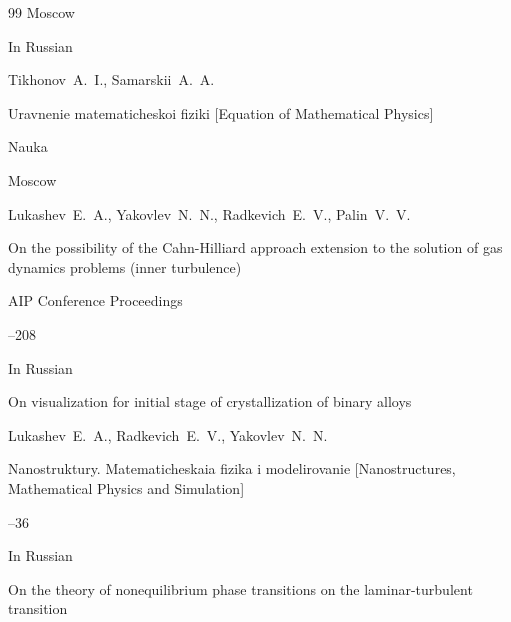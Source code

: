 \begin{thebibliography}{99}
\publaddr Moscow







\lang In Russian

\by Tikhonov~A.~I., Samarskii~A.~A.

\book Uravnenie matematicheskoi fiziki \rm [Equation of Mathematical Physics]


\publ Nauka

\publaddr Moscow







\by Lukashev~E.~A., Yakovlev~N.~N., Radkevich~E.~V., Palin~V.~V.

\paper On the possibility of the Cahn-Hilliard approach extension to the solution of gas dynamics problems (inner turbulence)

\jour AIP Conference Proceedings 


--208










\lang In Russian

\paper  On visualization for initial stage of crystallization of binary alloys

\by Lukashev~E.~A., Radkevich~E.~V., Yakovlev~N.~N.

\jour Nanostruktury. Matematicheskaia fizika i modelirovanie \rm [Nanostructures, Mathematical Physics and Simulation]




--36






\lang In Russian

\paper On the theory of nonequilibrium phase transitions on the laminar-turbulent transition


\end{thebibliography}
